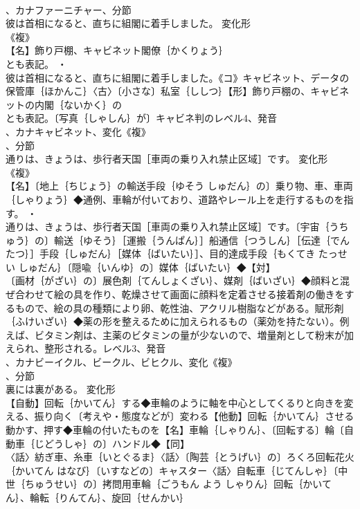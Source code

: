 \documentclass[8pt]{extreport}
\begin{document}
\begin{CJK}{UTF8}{min}
\\	、カナファーニチャー、分節
\\	彼は首相になると、直ちに組閣に着手しました。	変化形 
\\	《複》
\\	【名】飾り戸棚、キャビネット閣僚｛かくりょう｝
\\	とも表記。 ・
\\	彼は首相になると、直ちに組閣に着手しました。《コ》キャビネット、データの保管庫｛ほかんこ｝〈古〉〔小さな〕私室｛ししつ｝【形】飾り戸棚の、キャビネットの内閣｛ないかく｝の
\\	とも表記。〔写真｛しゃしん｝が〕キャビネ判のレベル4、発音
\\	、カナキャビネット、変化《複》
\\	、分節
\\	通りは、きょうは、歩行者天国［車両の乗り入れ禁止区域］です。	変化形 
\\	《複》
\\	【名】〔地上｛ちじょう｝の輸送手段｛ゆそう しゅだん｝の〕乗り物、車、車両｛しゃりょう｝◆通例、車輪が付いており、道路やレール上を走行するものを指す。 ・
\\	通りは、きょうは、歩行者天国［車両の乗り入れ禁止区域］です。〔宇宙｛うちゅう｝の〕輸送｛ゆそう｝［運搬｛うんぱん｝］船通信｛つうしん｝［伝達｛でんたつ｝］手段｛しゅだん｝［媒体｛ばいたい｝］、目的達成手段｛もくてき たっせい しゅだん｝〔隠喩｛いんゆ｝の〕媒体｛ばいたい｝◆【対】
\\	〔画材｛がざい｝の〕展色剤｛てんしょくざい｝、媒剤｛ばいざい｝◆顔料と混ぜ合わせて絵の具を作り、乾燥させて画面に顔料を定着させる接着剤の働きをするもので、絵の具の種類により卵、乾性油、アクリル樹脂などがある。賦形剤｛ふけいざい｝◆薬の形を整えるために加えられるもの（薬効を持たない）。例えば、ビタミン剤は、主薬のビタミンの量が少ないので、増量剤として粉末が加えられ、整形される。レベル3、発音
\\	、カナビーイクル、ビークル、ビヒクル、変化《複》
\\	、分節
\\	裏には裏がある。	変化形 
\\	【自動】回転｛かいてん｝する◆車輪のように軸を中心としてくるりと向きを変える、振り向く〔考えや・態度などが〕変わる【他動】回転｛かいてん｝させる動かす、押す◆車輪の付いたものを【名】車輪｛しゃりん｝、〔回転する〕輪〔自動車｛じどうしゃ｝の〕ハンドル◆【同】
\\	〈話〉紡ぎ車、糸車｛いとぐるま｝〈話〉〔陶芸｛とうげい｝の〕ろくろ回転花火｛かいてん はなび｝〔いすなどの〕キャスター〈話〉自転車｛じてんしゃ｝〔中世｛ちゅうせい｝の〕拷問用車輪｛ごうもん よう しゃりん｝回転｛かいてん｝、輪転｛りんてん｝、旋回｛せんかい｝

\end{CJK}
\end{document}
